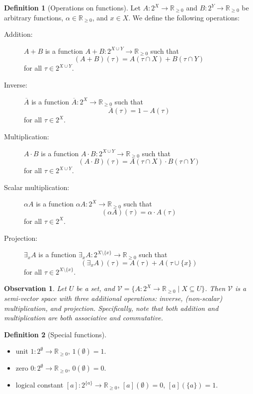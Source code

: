 \documentclass{article}
\newtheorem{observation}{Observation}
\theoremstyle{definition}
\newtheorem{definition}{Definition}
\theoremstyle{remark}
\begin{document}
\begin{definition}[Operations on functions]
  Let $A\colon 2^X \to \mathbb{R}_{\ge 0}$ and $B\colon 2^Y \to \mathbb{R}_{\ge
    0}$ be arbitrary functions, $\alpha \in \mathbb{R}_{\ge 0}$, and $x \in X$.
  We define the following operations:
  \begin{description}
  \item[Addition:] $A+B$ is a function $A+B\colon 2^{X \cup Y} \to
    \mathbb{R}_{\ge 0}$ such that
    \[
      (A+B)(\tau) = A(\tau \cap X) + B(\tau \cap Y)
    \]
    for all $\tau \in 2^{X \cup Y}$.
  \item[Inverse:] $\overline{A}$ is a function $\overline{A}\colon 2^X \to
    \mathbb{R}_{\ge 0}$ such that
    \[
      \overline{A}(\tau) = 1 - A(\tau)
    \]
    for all $\tau \in 2^X$.
  \item[Multiplication:] $A \cdot B$ is a function $A \cdot B\colon 2^{X \cup Y}
    \to \mathbb{R}_{\ge 0}$ such that
    \[
      (A \cdot B)(\tau) = A(\tau \cap X) \cdot B(\tau \cap Y)
    \]
    for all $\tau \in 2^{X \cup Y}$.
  \item[Scalar multiplication:] $\alpha A$ is a function $\alpha A\colon 2^X \to
    \mathbb{R}_{\ge 0}$ such that
    \[
      (\alpha A)(\tau) = \alpha \cdot A(\tau)
    \]
    for all $\tau \in 2^X$.
  \item[Projection:] $\exists_xA$ is a function $\exists_xA\colon 2^{X \setminus
      \{ x \}} \to \mathbb{R}_{\ge 0}$ such that
    \[
      (\exists_xA)(\tau) = A(\tau) + A(\tau \cup \{ x \})
    \]
    for all $\tau \in 2^{X \setminus \{x \}}$.
  \end{description}
\end{definition}

\begin{observation}
  Let $U$ be a set, and $\mathcal{V} = \{ A\colon 2^X \to \mathbb{R}_{\ge 0}
  \mid X \subseteq U \}$. Then $\mathcal{V}$ is a semi-vector space with three
  additional operations: inverse, (non-scalar) multiplication, and projection.
  Specifically, note that both addition and multiplication are both associative
  and commutative.
\end{observation}

\begin{definition}[Special functions]
  \phantom{}
  \begin{itemize}
  \item unit $1\colon 2^\emptyset \to \mathbb{R}_{\ge 0}$, $1(\emptyset) = 1$.
  \item zero $0\colon 2^\emptyset \to \mathbb{R}_{\ge 0}$, $0(\emptyset) = 0$.
  \item logical constant $[a]\colon 2^{\{a\}} \to \mathbb{R}_{\ge 0}$,
    $[a](\emptyset) = 0$, $[a](\{a\}) = 1$.
  \end{itemize}
\end{definition}
\end{document}
